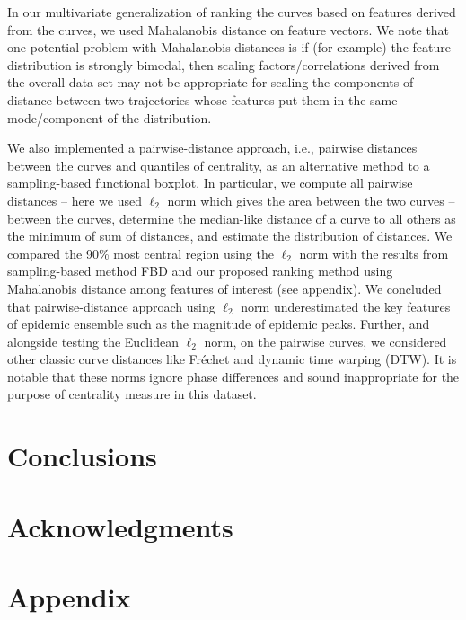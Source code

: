 \documentclass[fleqn,10pt,lineno]{wlpeerj}
\begin{document}
In our multivariate generalization of ranking the curves based on features derived from the curves, we used Mahalanobis distance on feature vectors. We note that one potential problem with Mahalanobis distances is if (for example) the feature distribution is strongly bimodal, then scaling factors/correlations derived from the overall data set may not be appropriate for scaling the components of distance between two trajectories whose features put them in the same mode/component of the distribution.

We also implemented a pairwise-distance approach, i.e., pairwise distances between the curves and quantiles of centrality, as an alternative method to a sampling-based functional boxplot. In particular, we compute all pairwise distances -- here we used $\ell_2$ norm which gives the area between the two curves -- between the curves, determine the median-like distance of a curve to all others as the minimum of sum of distances, and estimate the distribution of distances. We compared the 90\% most central region using the $\ell_2$ norm with the results from sampling-based method FBD and our proposed ranking method using Mahalanobis distance among features of interest (see appendix). We concluded that pairwise-distance approach using $\ell_2$ norm underestimated the key features of epidemic ensemble such as the magnitude of epidemic peaks. Further, and alongside testing the Euclidean $\ell_2$ norm, on the pairwise curves, we considered other classic curve distances like Fréchet and dynamic time warping (DTW). It is notable that these norms ignore phase differences and sound inappropriate for the purpose of centrality measure in this dataset.

\section*{Conclusions}

\section*{Acknowledgments}



\section*{Appendix}
\end{document}
